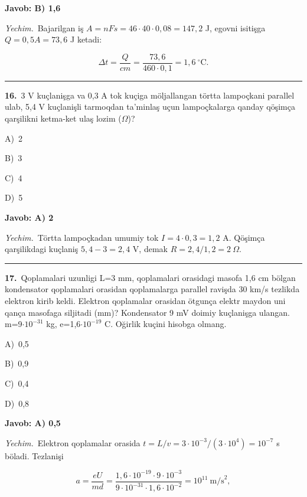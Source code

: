 \documentclass[11pt,a4paper]{article}
\newcommand{\opt}[2]{\hspace*{4mm}#1)\ #2\par}
\begin{document}
\noindent\colorbox{gray!12}{\parbox{\dimexpr\linewidth-2\fboxsep}{\textbf{Javob: B) 1,6}}}\par\smallskip
\noindent\textit{Yechim.}\ Bajarilgan iş $A=nFs=46\cdot40\cdot0{,}08=147{,}2$ J, egovni isitişga $Q=0{,}5A=73{,}6$ J ketadi:\par
\[\Delta t=\frac{Q}{cm}=\frac{73{,}6}{460\cdot0{,}1}=1{,}6\ ^\circ\text{C}.\]\par\medskip\hrule\medskip
{}\noindent\begin{minipage}{\linewidth}
\textbf{16.}\ 3 V kuçlanişga va 0,3 A tok kuçiga möljallangan törtta lampoçkani parallel ulab, 5,4 V kuçlanişli tarmoqdan ta’minlaş uçun lampoçkalarga qanday qöşimça qarşilikni ketma-ket ulaş lozim ($\Omega$)?\par\smallskip
\opt{A}{2}
\opt{B}{3}
\opt{C}{4}
\opt{D}{5}
\end{minipage}\vspace{2pt}\par
\noindent\colorbox{gray!12}{\parbox{\dimexpr\linewidth-2\fboxsep}{\textbf{Javob: A) 2}}}\par\smallskip
\noindent\textit{Yechim.}\ Törtta lampoçkadan umumiy tok $I=4\cdot0{,}3=1{,}2$ A. Qöşimça qarşilikdagi kuçlaniş $5{,}4-3=2{,}4$ V, demak $R=2{,}4/1{,}2=2\ \Omega$.\par\par\medskip\hrule\medskip
{}\noindent\begin{minipage}{\linewidth}
\textbf{17.}\ Qoplamalari uzunligi L=3 mm, qoplamalari orasidagi masofa 1,6 cm bölgan kondensator qoplamalari orasidan qoplamalarga parallel ravişda 30 km/s tezlikda elektron kirib keldi. Elektron qoplamalar orasidan ötgunça elektr maydon uni qança masofaga siljitadi (mm)? Kondensator 9 mV doimiy kuçlanişga ulangan. m=9$\cdot10^{-31}$ kg, e=1,6$\cdot10^{-19}$ C. Oğirlik kuçini hisobga olmang.\par\smallskip
\opt{A}{0,5}
\opt{B}{0,9}
\opt{C}{0,4}
\opt{D}{0,8}
\end{minipage}\vspace{2pt}\par
\noindent\colorbox{gray!12}{\parbox{\dimexpr\linewidth-2\fboxsep}{\textbf{Javob: A) 0,5}}}\par\smallskip
\noindent\textit{Yechim.}\ Elektron qoplamalar orasida $t=L/v=3\cdot10^{-3}/(3\cdot10^4)=10^{-7}$ s böladi. Tezlanişi\par
\[a=\frac{eU}{md}=\frac{1{,}6\cdot10^{-19}\cdot9\cdot10^{-3}}{9\cdot10^{-31}\cdot1{,}6\cdot10^{-2}}=10^{11}\ \text{m/s}^2,\]
\end{document}
